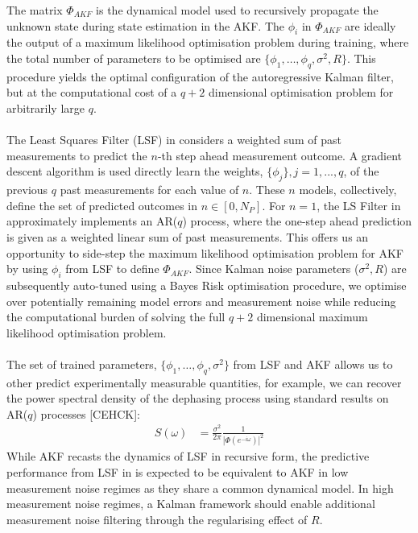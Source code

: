The matrix $\Phi_{AKF}$ is the dynamical model used to recursively propagate the unknown state during state estimation in the AKF. The ${\phi_i}$ in $\Phi_{AKF}$ are ideally the output of a maximum likelihood optimisation problem during training, where the total number of parameters to be optimised are $\{\phi_1, \hdots, \phi_q, \sigma^2, R \}$. This procedure yields the optimal configuration of the autoregressive Kalman filter, but at the computational cost of a $q+2$ dimensional optimisation problem for arbitrarily large $q$.
\\
\\
The Least Squares Filter (LSF) in \cite{mavadia2017} considers a weighted sum of past measurements to predict the $n$-th step ahead measurement outcome. A gradient descent algorithm is used directly learn the weights, $\{\phi_j\}, j = 1, ... , q $, of the previous $q$ past measurements for each value of $n$. These $n$ models, collectively, define the set of predicted outcomes in $n \in [0, N_P]$. For $n=1$, the LS Filter in \cite{mavadia2017} approximately implements an AR($q$) process, where the one-step ahead prediction is given as a weighted linear sum of past measurements. This offers us an opportunity to side-step the maximum likelihood optimisation problem for AKF by using ${\phi_i}$ from LSF to define $\Phi_{AKF}$. Since Kalman noise parameters ($\sigma^2, R$) are subsequently auto-tuned using a Bayes Risk optimisation procedure, we optimise over potentially remaining model errors and measurement noise while reducing the computational burden of solving the full $q+2$ dimensional maximum likelihood optimisation problem. 
\\
\\
The set of trained parameters, $\{\phi_1, \hdots, \phi_q, \sigma^2\}$ from LSF and AKF allows us to other predict experimentally measurable quantities, for example, we can recover the power spectral density of the dephasing process using standard results on AR($q$) processes [CEHCK]:
\begin{align}
S(\omega) & = \frac{\sigma^2}{2 \pi }\frac{1}{|\Phi(e^{-i\omega})|^2} \label{eqn:sec:ap_ssp_ar_spectden} 
\end{align}
While AKF recasts the dynamics of LSF in recursive form, the predictive performance from LSF in \cite{mavadia2017} is expected to be equivalent to AKF in low measurement noise regimes as they share a common dynamical model. In high measurement noise regimes, a Kalman framework should enable additional measurement noise filtering through the regularising effect of $R$. 

